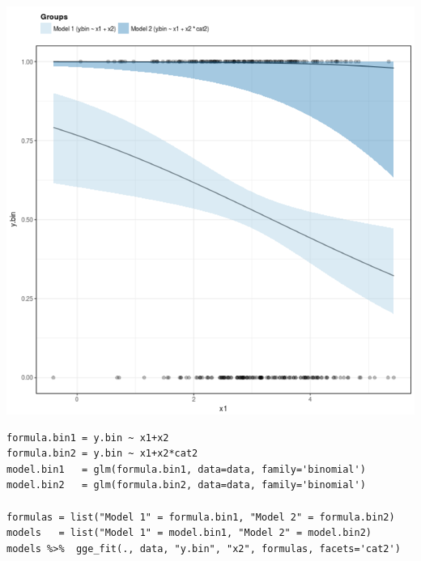 \documentclass[a4paper]{article}
\begin{document}
\begin{enumerate}
\begin{center}
\includegraphics[width=.9\linewidth]{fig-fitted-many-models-bin.png}
\end{center}

\lstset{numbers=left,language=r,label= ,caption= ,captionpos=b}
\begin{lstlisting}
formula.bin1 = y.bin ~ x1+x2
formula.bin2 = y.bin ~ x1+x2*cat2
model.bin1   = glm(formula.bin1, data=data, family='binomial')
model.bin2   = glm(formula.bin2, data=data, family='binomial')

formulas = list("Model 1" = formula.bin1, "Model 2" = formula.bin2)
models   = list("Model 1" = model.bin1, "Model 2" = model.bin2)
models %>%  gge_fit(., data, "y.bin", "x2", formulas, facets='cat2')

\end{lstlisting}


\end{enumerate}
\end{document}
